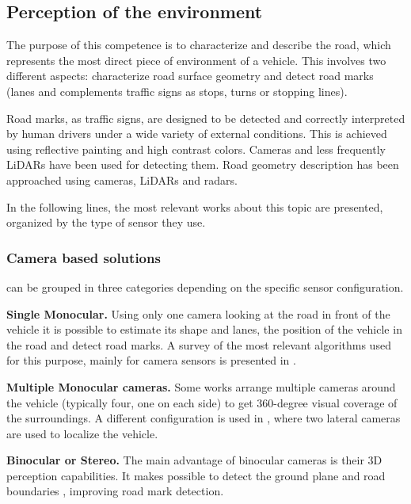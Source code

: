 \documentclass[journal]{IEEEtran}
\begin{document}
\subsection{Perception of the environment}
The purpose of this competence is to characterize and describe the road, which
represents the most direct piece of environment of a vehicle. This 
involves two different aspects: characterize road surface geometry and detect road marks (lanes
and complements traffic signs as stops, turns or stopping lines).

Road marks, as traffic signs, are designed to be detected and 
correctly interpreted by human drivers under a wide variety of external 
conditions. This is achieved using reflective painting and high contrast 
colors. Cameras and less frequently LiDARs have been used for detecting them.
Road geometry description has been approached using cameras, LiDARs and radars.

In the following lines, the most relevant works about this topic are presented, 
organized by the type of sensor they use.

\subsubsection{Camera based solutions}
can be grouped in three categories depending on the specific sensor 
configuration.

\textbf{Single Monocular.}
Using only one 
camera looking at the road in front of the vehicle it is possible to estimate 
its shape and lanes, the position of the vehicle in the road and  
detect road marks. A survey of the most 
relevant algorithms used for this purpose, mainly for camera sensors is 
presented in \cite{hillel2014recent}.

\textbf{Multiple Monocular cameras.} 
Some works \cite{lee2017avm, kum2013lane} arrange multiple cameras 
around the vehicle (typically four, one on each side) to get 360-degree 
visual coverage of the surroundings. 
A different configuration is used in \cite{Ieng2003}, where two lateral cameras
are used to localize the vehicle. 

\textbf{Binocular or Stereo.} 
The main advantage of binocular cameras is their 3D perception capabilities.
It makes possible to detect the ground plane and road boundaries 
\cite{schreiber2013laneloc, ozgunalp2017multiple}, improving road mark 
detection. 
\end{document}
